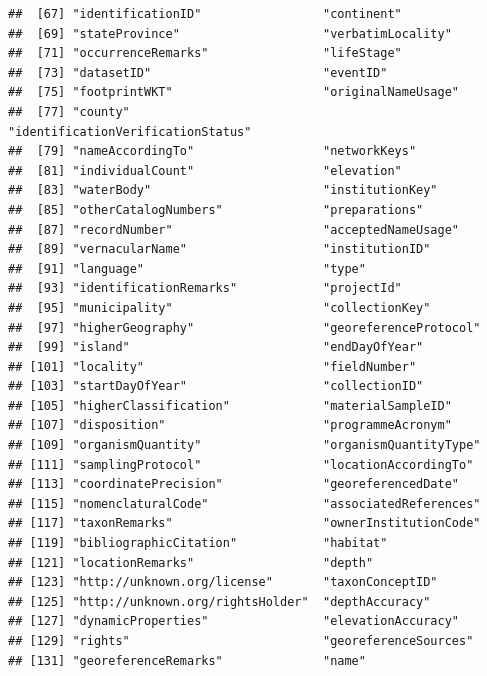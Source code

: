\documentclass[
]{book}
\begin{document}
\begin{verbatim}
##  [67] "identificationID"                 "continent"                       
##  [69] "stateProvince"                    "verbatimLocality"                
##  [71] "occurrenceRemarks"                "lifeStage"                       
##  [73] "datasetID"                        "eventID"                         
##  [75] "footprintWKT"                     "originalNameUsage"               
##  [77] "county"                           "identificationVerificationStatus"
##  [79] "nameAccordingTo"                  "networkKeys"                     
##  [81] "individualCount"                  "elevation"                       
##  [83] "waterBody"                        "institutionKey"                  
##  [85] "otherCatalogNumbers"              "preparations"                    
##  [87] "recordNumber"                     "acceptedNameUsage"               
##  [89] "vernacularName"                   "institutionID"                   
##  [91] "language"                         "type"                            
##  [93] "identificationRemarks"            "projectId"                       
##  [95] "municipality"                     "collectionKey"                   
##  [97] "higherGeography"                  "georeferenceProtocol"            
##  [99] "island"                           "endDayOfYear"                    
## [101] "locality"                         "fieldNumber"                     
## [103] "startDayOfYear"                   "collectionID"                    
## [105] "higherClassification"             "materialSampleID"                
## [107] "disposition"                      "programmeAcronym"                
## [109] "organismQuantity"                 "organismQuantityType"            
## [111] "samplingProtocol"                 "locationAccordingTo"             
## [113] "coordinatePrecision"              "georeferencedDate"               
## [115] "nomenclaturalCode"                "associatedReferences"            
## [117] "taxonRemarks"                     "ownerInstitutionCode"            
## [119] "bibliographicCitation"            "habitat"                         
## [121] "locationRemarks"                  "depth"                           
## [123] "http://unknown.org/license"       "taxonConceptID"                  
## [125] "http://unknown.org/rightsHolder"  "depthAccuracy"                   
## [127] "dynamicProperties"                "elevationAccuracy"               
## [129] "rights"                           "georeferenceSources"             
## [131] "georeferenceRemarks"              "name"                            

\end{verbatim}
\end{document}
